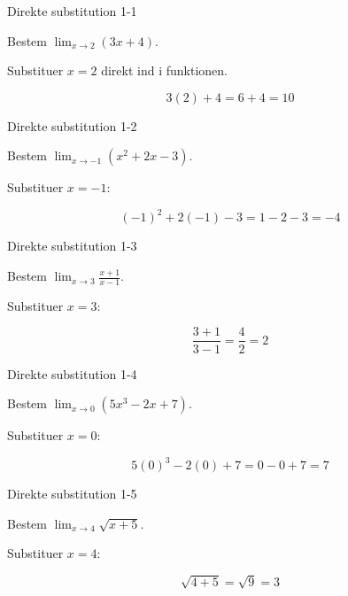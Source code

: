 \documentclass{article}
\begin{document}

\tableofcontents
\newpage

\begin{exercise}{Direkte substitution 1-1}

Bestem $\lim_{x \to 2} (3x + 4)$.


\hint

Substituer $x = 2$ direkt ind i funktionen.

\hint
\[
3(2) + 4 = 6 + 4 = 10
\]

\end{exercise}

\newpage

\begin{exercise}{Direkte substitution 1-2}

Bestem $\lim_{x \to -1} (x^2 + 2x - 3)$.


\hint

Substituer $x = -1$:

\hint
\[
(-1)^2 + 2(-1) - 3 = 1 - 2 - 3 = -4
\]

\end{exercise}

\newpage

\begin{exercise}{Direkte substitution 1-3}

Bestem $\lim_{x \to 3} \frac{x + 1}{x - 1}$.


\hint

Substituer $x = 3$:

\hint
\[
\frac{3 + 1}{3 - 1} = \frac{4}{2} = 2
\]

\end{exercise}

\newpage

\begin{exercise}{Direkte substitution 1-4}

Bestem $\lim_{x \to 0} (5x^3 - 2x + 7)$.


\hint

Substituer $x = 0$:

\hint
\[
5(0)^3 - 2(0) + 7 = 0 - 0 + 7 = 7
\]

\end{exercise}

\newpage

\begin{exercise}{Direkte substitution 1-5}

Bestem $\lim_{x \to 4} \sqrt{x + 5}$.


\hint

Substituer $x = 4$:

\hint
\[
\sqrt{4 + 5} = \sqrt{9} = 3
\]

\end{exercise}
\end{document}
